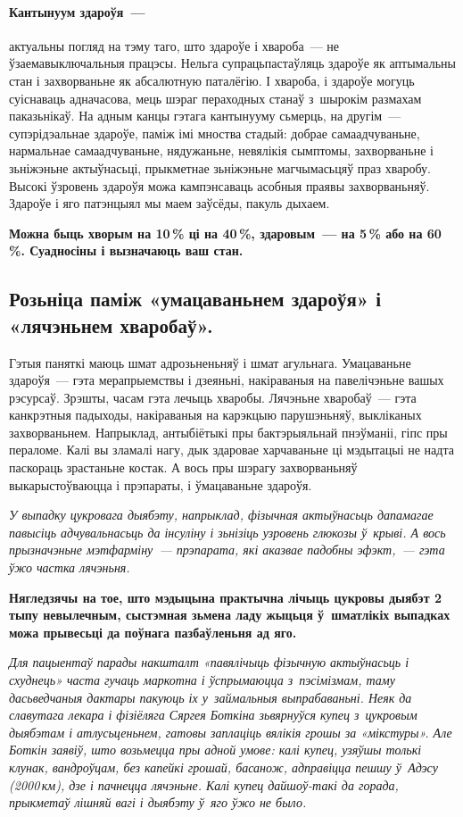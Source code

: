 \paragraph{Кантынуум здароўя~---} актуальны погляд на тэму таго, што здароўе і хвароба~--- не ўзаемавыключальныя працэсы. Нельга супрацьпастаўляць здароўе як аптымальны стан і захворваньне як абсалютную паталёгію. І хвароба, і здароўе могуць суіснаваць адначасова, мець шэраг пераходных станаў з~шырокім размахам паказьнікаў. На адным канцы гэтага кантынууму сьмерць, на другім~--- супэрідэальнае здароўе, паміж імі мноства стадый: добрае самаадчуваньне, нармальнае самаадчуваньне, нядужаньне, невялікія сымптомы, захворваньне і зьніжэньне актыўнасьці, прыкметнае зьніжэньне магчымасьцяў праз хваробу. Высокі ўзровень здароўя можа кампэнсаваць асобныя праявы захворваньняў. Здароўе і яго патэнцыял мы маем заўсёды, пакуль дыхаем. 

\textbf{Можна быць хворым на 10\,\% ці на 40\,\%, здаровым~--- на 5\,\% або на 60\,\%. Суадносіны і вызначаюць ваш стан.}

\subsection*{Розьніца паміж «умацаваньнем здароўя» і «лячэньнем хваробаў».} 

Гэтыя паняткі маюць шмат адрозьненьняў і шмат агульнага. Умацаваньне здароўя~--- гэта мерапрыемствы і дзеяньні, накіраваныя на павелічэньне вашых рэсурсаў. Зрэшты, часам гэта лечыць хваробы. Лячэньне хваробаў~--- гэта канкрэтныя падыходы, накіраваныя на карэкцыю парушэньняў, выкліканых захворваньнем. Напрыклад, антыбіётыкі пры бактэрыяльнай пнэўманіі, гіпс пры пераломе. Калі вы зламалі нагу, дык здаровае харчаваньне ці мэдытацыі не надта паскораць зрастаньне костак. А вось пры шэрагу захворваньняў выкарыстоўваюцца і прэпараты, і ўмацаваньне здароўя.

\emph{У выпадку цукровага дыябэту, напрыклад, фізычная актыўнасьць дапамагае павысіць адчувальнасьць да інсуліну і зьнізіць узровень глюкозы ў~крыві. А вось прызначэньне мэтфарміну~--- прэпарата, які аказвае падобны эфэкт,~--- гэта ўжо частка лячэньня.} 

\textbf{Нягледзячы на тое, што мэдыцына практычна лічыць цукровы дыябэт 2 тыпу невылечным, сыстэмная зьмена ладу жыцьця ў~шматлікіх выпадках можа прывесьці да поўнага пазбаўленьня ад яго.}

\emph{Для пацыентаў парады накшталт «павялічыць фізычную актыўнасьць і схуднець» часта гучаць маркотна і ўспрымаюцца з~пэсімізмам, таму дасьведчаныя дактары пакуюць іх у~займальныя выпрабаваньні. Неяк да славутага лекара і фізіёляга Сяргея Боткіна зьвярнуўся купец з~цукровым дыябэтам і атлусьценьнем, гатовы заплаціць вялікія грошы за «мікстуры». Але Боткін заявіў, што возьмецца пры адной умове: калі купец, узяўшы толькі клунак, вандроўцам, без капейкі грошай, басанож, адправіцца пешшу ў~Адэсу (2000\,км), дзе і пачнецца лячэньне. Калі купец дайшоў-такі да горада, прыкметаў лішняй вагі і дыябэту ў~яго ўжо не было.}


